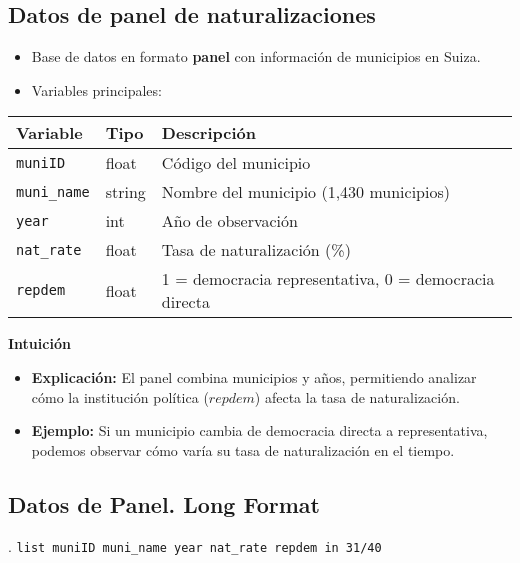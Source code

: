 \documentclass[12pt]{article}
\begin{document}
\subsection*{\noindent\textbf{Datos de panel de naturalizaciones}}

\begin{itemize}
    \item Base de datos en formato \textbf{panel} con información de municipios en Suiza.
    \item Variables principales:
\end{itemize}

\begin{table}[H]
\centering
\begin{tabular}{l l l}
\hline
\textbf{Variable} & \textbf{Tipo} & \textbf{Descripción} \\
\hline
\texttt{muniID}   & float  & Código del municipio \\
\texttt{muni\_name} & string & Nombre del municipio (1,430 municipios) \\
\texttt{year}     & int    & Año de observación \\
\texttt{nat\_rate} & float  & Tasa de naturalización (\%) \\
\texttt{repdem}   & float  & 1 = democracia representativa, 0 = democracia directa \\
\hline
\end{tabular}
\end{table}

\noindent\textbf{Intuición}
\begin{itemize}
    \item \textbf{Explicación:} El panel combina municipios y años, permitiendo analizar cómo la institución política ($repdem$) afecta la tasa de naturalización.
    \item \textbf{Ejemplo:} Si un municipio cambia de democracia directa a representativa, podemos observar cómo varía su tasa de naturalización en el tiempo.
\end{itemize}

\subsection*{\noindent\textbf{Datos de Panel. Long Format}}

. \texttt{list muniID muni\_name year nat\_rate repdem in 31/40}
\end{document}
